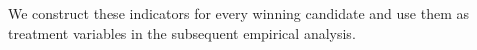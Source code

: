 \documentclass[12pt]{article}
\begin{document}
We construct these indicators for every winning candidate and use them as treatment variables in the subsequent empirical analysis.

\end{document}
